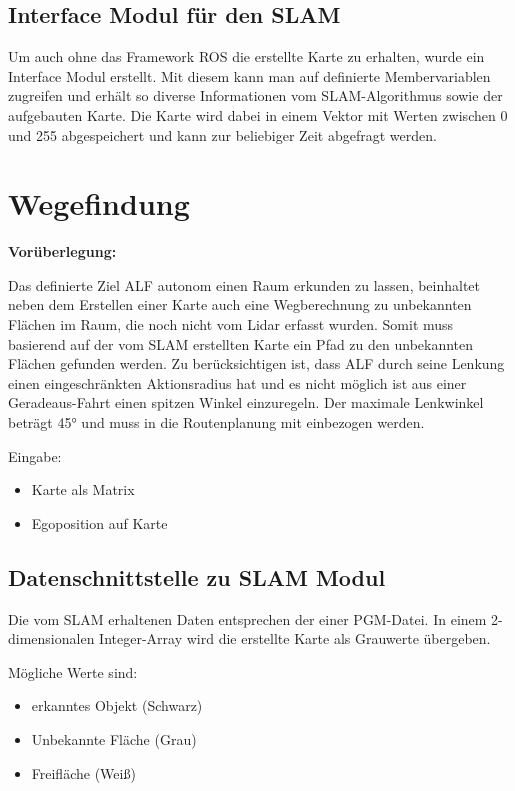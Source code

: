 \subsection{Interface Modul für den SLAM}

Um auch ohne das Framework ROS die erstellte Karte zu erhalten, wurde ein Interface Modul erstellt. Mit diesem kann man auf definierte Membervariablen zugreifen und erhält so diverse Informationen vom SLAM-Algorithmus sowie der aufgebauten Karte. Die Karte wird dabei in einem Vektor mit Werten zwischen 0 und 255 abgespeichert und kann zur beliebiger Zeit abgefragt werden. 













\section{Wegefindung}

\textbf{Vorüberlegung:}

Das definierte Ziel ALF autonom einen Raum erkunden zu lassen, beinhaltet neben dem Erstellen einer Karte auch eine Wegberechnung zu unbekannten Flächen im Raum, die noch nicht vom Lidar erfasst wurden. Somit muss basierend auf der vom SLAM erstellten Karte ein Pfad zu den unbekannten Flächen gefunden werden.
Zu berücksichtigen ist, dass ALF durch seine Lenkung einen eingeschränkten Aktionsradius hat und es nicht möglich ist aus einer Geradeaus-Fahrt einen spitzen Winkel einzuregeln. Der maximale Lenkwinkel beträgt 45° und muss in die Routenplanung mit einbezogen werden. 

Eingabe: 
\begin{itemize}
\item Karte als Matrix
\item Egoposition auf Karte
\end{itemize}


\subsection{Datenschnittstelle zu SLAM Modul}

Die vom SLAM erhaltenen Daten entsprechen der einer PGM-Datei. In einem 2-dimensionalen Integer-Array wird die erstellte Karte als Grauwerte übergeben. 

Mögliche Werte sind:
\begin{itemize}
\item erkanntes Objekt (Schwarz)
\item Unbekannte Fläche (Grau)
\item Freifläche (Weiß)
\end{itemize}

